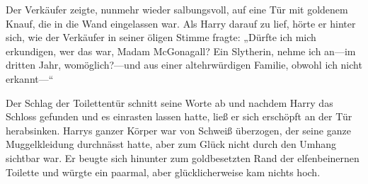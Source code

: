 Der Verkäufer zeigte, nunmehr wieder salbungsvoll, auf eine Tür mit goldenem Knauf, die in die Wand eingelassen war. Als Harry darauf zu lief, hörte er hinter sich, wie der Verkäufer in seiner öligen Stimme fragte: „Dürfte ich mich erkundigen, wer das war, Madam McGonagall? Ein Slytherin, nehme ich an—im dritten Jahr, womöglich?—und aus einer altehrwürdigen Familie, obwohl ich nicht erkannt—“

Der Schlag der Toilettentür schnitt seine Worte ab und nachdem Harry das Schloss gefunden und es einrasten lassen hatte, ließ er sich erschöpft an der Tür herabsinken. Harrys ganzer Körper war von Schweiß überzogen, der seine ganze Muggelkleidung durchnässt hatte, aber zum Glück nicht durch den Umhang sichtbar war. Er beugte sich hinunter zum goldbesetzten Rand der elfenbeinernen Toilette und würgte ein paarmal, aber glücklicherweise kam nichts hoch.

\later

